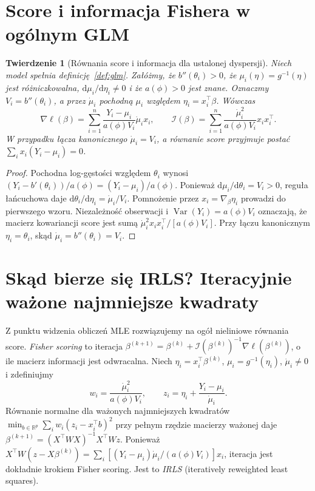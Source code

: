 \documentclass[11pt,a4paper,oneside]{report}
\numberwithin{equation}{chapter}
\theoremstyle{plain}
\newtheorem{twierdzenie}{Twierdzenie}[chapter]
\theoremstyle{definition}
\theoremstyle{remark}
\newcommand{\R}{\mathbb R}
\newcommand{\Var}{\operatorname{Var}}
\newcommand{\dd}{\mathrm d}
\begin{document}
\section{Score i informacja Fishera w ogólnym GLM}
\begin{twierdzenie}[Równania score i informacja dla ustalonej dyspersji]
\label{thm:glm-general-score}
Niech model spełnia definicję~\ref{def:glm}.
Załóżmy, że $b''(\theta_i)>0$, że
$\mu_i(\eta)=g^{-1}(\eta)$ jest różniczkowalna,
$\dd\mu_i/\dd\eta_i\ne0$ i że $a(\phi)>0$
jest znane. Oznaczmy $V_i=b''(\theta_i)$,
a przez $\dot\mu_i$ pochodną $\mu_i$ względem
$\eta_i=x_i^\top\beta$. Wówczas
\[
 \nabla\ell(\beta)=\sum_{i=1}^n
 \frac{Y_i-\mu_i}{a(\phi)V_i}\dot\mu_i x_i,
 \qquad
 \mathcal I(\beta)=\sum_{i=1}^n
 \frac{\dot\mu_i^2}{a(\phi)V_i}x_ix_i^\top.
\]
W przypadku łącza kanonicznego
$\dot\mu_i=V_i$, a równanie score przyjmuje postać
$\sum_i x_i(Y_i-\mu_i)=0$.
\end{twierdzenie}
\begin{proof}
Pochodna log-gęstości względem $\theta_i$ wynosi
$(Y_i-b'(\theta_i))/a(\phi)=(Y_i-\mu_i)/a(\phi)$.
Ponieważ $\dd\mu_i/\dd\theta_i=V_i>0$,
reguła łańcuchowa daje
$\dd\theta_i/\dd\eta_i=\dot\mu_i/V_i$.
Pomnożenie przez $x_i=\nabla_\beta\eta_i$ prowadzi
do pierwszego wzoru. Niezależność obserwacji i
$\Var(Y_i)=a(\phi)V_i$ oznaczają, że macierz
kowariancji score jest sumą
$\dot\mu_i^2x_ix_i^\top/[a(\phi)V_i]$.
Przy łączu kanonicznym $\eta_i=\theta_i$, skąd
$\dot\mu_i=b''(\theta_i)=V_i$.
\end{proof}

\section{Skąd bierze się IRLS? Iteracyjnie ważone najmniejsze kwadraty}
Z punktu widzenia obliczeń MLE rozwiązujemy na ogół
nieliniowe równania score. \emph{Fisher scoring} to
iteracja $\beta^{(k+1)}=\beta^{(k)}+
\mathcal I(\beta^{(k)})^{-1}\nabla\ell(\beta^{(k)})$,
o ile macierz informacji jest odwracalna.
Niech $\eta_i=x_i^\top\beta^{(k)}$, $\mu_i=g^{-1}(\eta_i)$,
$\dot\mu_i\ne0$ i zdefiniujmy
\[
 w_i=\frac{\dot\mu_i^2}{a(\phi)V_i},\qquad
 z_i=\eta_i+\frac{Y_i-\mu_i}{\dot\mu_i}.
\]
Równanie normalne dla ważonych najmniejszych kwadratów
$\min_{b\in\R^p}\sum_iw_i(z_i-x_i^\top b)^2$
przy pełnym rzędzie macierzy ważonej daje
$\beta^{(k+1)}=(X^\top WX)^{-1}X^\top Wz$.
Ponieważ
$X^\top W(z-X\beta^{(k)})=
\sum_i[(Y_i-\mu_i)\dot\mu_i/(a(\phi)V_i)]x_i$,
iteracja jest dokładnie krokiem Fisher scoring.
Jest to \emph{IRLS} (iteratively reweighted least squares).
\end{document}
